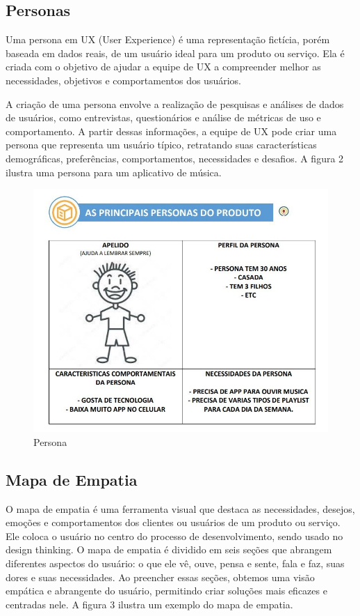 \documentclass[12pt]{article}
\begin{document}
\subsection{Personas}
Uma persona em UX (User Experience) é uma representação fictícia, porém baseada em dados reais, de um usuário ideal para um produto ou serviço. Ela é criada com o objetivo de ajudar a equipe de UX a compreender melhor as necessidades, objetivos e comportamentos dos usuários.

A criação de uma persona envolve a realização de pesquisas e análises de dados de usuários, como entrevistas, questionários e análise de métricas de uso e comportamento. A partir dessas informações, a equipe de UX pode criar uma persona que representa um usuário típico, retratando suas características demográficas, preferências, comportamentos, necessidades e desafios. A figura 2 ilustra uma persona para um aplicativo de música.

\begin{figure}[ht]
\centering
\includegraphics[width=.7\textwidth, scale=6.7]{persona.jpeg}
\caption{Persona}
\label{fig:typical-figure}
\end{figure}

\subsection{Mapa de Empatia}
O mapa de empatia é uma ferramenta visual que destaca as necessidades, desejos, emoções e comportamentos dos clientes ou usuários de um produto ou serviço. Ele coloca o usuário no centro do processo de desenvolvimento, sendo usado no design thinking.
O mapa de empatia é dividido em seis seções que abrangem diferentes aspectos do usuário: o que ele vê, ouve, pensa e sente, fala e faz, suas dores e suas necessidades.
Ao preencher essas seções, obtemos uma visão empática e abrangente do usuário, permitindo criar soluções mais eficazes e centradas nele.
A figura 3 ilustra um exemplo do mapa de empatia.
\end{document}
